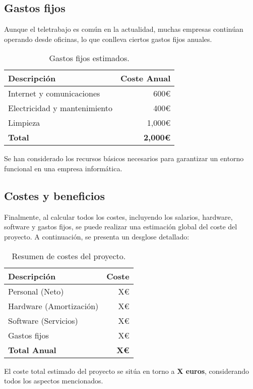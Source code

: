 \subsection{Gastos fijos}

Aunque el teletrabajo es común en la actualidad, muchas empresas continúan operando desde oficinas, lo que conlleva ciertos gastos fijos anuales.

\begin{table}[H]
\centering
\begin{tabular}{lr}
\toprule
Descripción & Coste Anual \\ 
\midrule
Internet y comunicaciones & 600€ \\
Electricidad y mantenimiento & 400€ \\
Limpieza & 1,000€ \\
\textbf{Total} & \textbf{2,000€} \\ 
\bottomrule
\end{tabular}
\caption{Gastos fijos estimados.}
\end{table}

Se han considerado los recursos básicos necesarios para garantizar un entorno funcional en una empresa informática.

\subsection{Costes y beneficios}

Finalmente, al calcular todos los costes, incluyendo los salarios, hardware, software y gastos fijos, se puede realizar una estimación global del coste del proyecto. A continuación, se presenta un desglose detallado:

\begin{table}[H]
\centering
\begin{tabular}{lr}
\toprule
Descripción & Coste \\ 
\midrule
Personal (Neto) & X€ \\ 
Hardware (Amortización) & X€ \\ 
Software (Servicios) & X€ \\ 
Gastos fijos & X€ \\ 
\textbf{Total Anual} & \textbf{X€} \\ 
\bottomrule
\end{tabular}
\caption{Resumen de costes del proyecto.}
\end{table}

El coste total estimado del proyecto se sitúa en torno a \textbf{X euros}, considerando todos los aspectos mencionados.

